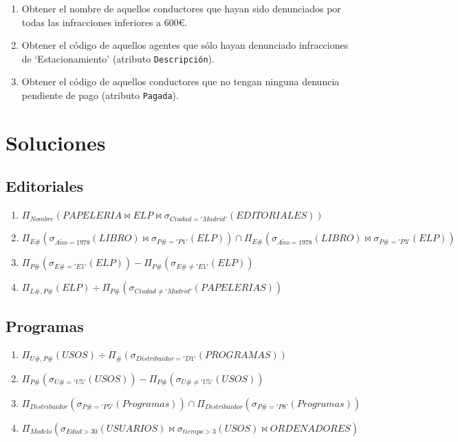 \documentclass{db-practice}
\begin{document}
\begin{enumerate}
    \item Obtener el nombre de aquellos conductores que hayan sido denunciados por todas las infracciones inferiores a 600€.
    \item Obtener el código de aquellos agentes que sólo hayan denunciado infracciones de `Estacionamiento' (atributo \texttt{Descripción}).
    \item Obtener el código de aquellos conductores que no tengan ninguna denuncia pendiente de pago (atributo \texttt{Pagada}).
\end{enumerate}

\section{Soluciones}

\subsection{Editoriales}

\begin{enumerate}
    \item $\Pi_{Nombre} \left( PAPELERIA \bowtie ELP \bowtie \sigma_{Ciudad='Madrid'} \left( EDITORIALES \right) \right)$
    \item $\Pi_{E\#} \left( \sigma_{A\tilde{n}o=1978} \left( LIBRO \right) \bowtie \sigma_{P\#='P1'} \left( ELP \right) \right) \cap \Pi_{E\#} \left( \sigma_{A\tilde{n}o=1978} \left( LIBRO \right) \bowtie \sigma_{P\#='P3'} \left( ELP \right) \right)$
    \item $\Pi_{P\#} \left( \sigma_{E\#='E1'} \left( ELP \right) \right) - \Pi_{P\#} \left( \sigma_{E\# \neq 'E1'} \left( ELP \right) \right)$
    \item $\Pi_{L\#,P\#} \left( ELP \right) \div \Pi_{P\#} \left( \sigma_{Ciudad \neq 'Madrid'} \left( PAPELERIAS \right) \right)$
\end{enumerate}

\subsection{Programas}

\begin{enumerate}
    \item $\Pi_{U\#, P\#} \left( USOS \right) \div \Pi_{\#} \left( \sigma_{Distribuidor='D1'} \left( PROGRAMAS \right) \right)$
    \item $\Pi_{P\#} \left( \sigma_{U\#='U5'} \left( USOS \right)\right) - \Pi_{P\#} \left( \sigma_{U\#\neq'U5'} \left( USOS \right)\right)$
    \item $\Pi_{Distribuidor} \left( \sigma_{P\#='P5'} \left( Programas \right) \right) \cap \Pi_{Distribuidor} \left( \sigma_{P\#='P8'} \left( Programas \right) \right)$
    \item $\Pi_{Modelo} \left( \sigma_{Edad > 30} \left( USUARIOS \right) \bowtie \sigma_{tiempo > 3} \left( USOS \right) \bowtie ORDENADORES \right)$
\end{enumerate}
\end{document}
